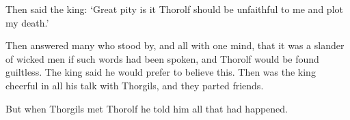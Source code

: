 Then said the king: `Great pity is it Thorolf should be unfaithful to me and plot my death.'

Then answered many who stood by, and all with one mind, that it was a slander of wicked men if such words had been spoken, and Thorolf would be found guiltless. The king said he would prefer to believe this. Then was the king cheerful in all his talk with Thorgils, and they parted friends.

But when Thorgils met Thorolf he told him all that had happened.
